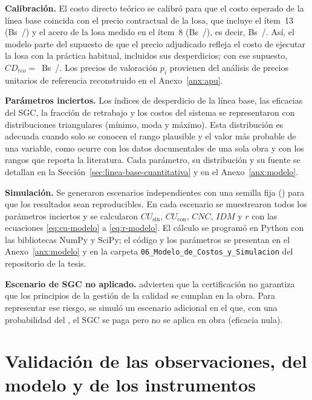 \textbf{Calibración.} El costo directo teórico se calibró para que el costo esperado de la línea base coincida con el precio contractual de la losa, que incluye el ítem~13 (Bs~\PUitemTrece/\mdos{}) y el acero de la losa medido en el ítem~8 (Bs~\PUaceroLosa/\mdos{}), es decir, Bs~\PUlosa/\mdos{}. Así, el modelo parte del supuesto de que el precio adjudicado refleja el costo de ejecutar la losa con la práctica habitual, incluidos sus desperdicios; con ese supuesto, $CD_{teo} = $~Bs~\CDteo/\mdos{}. Los precios de valoración $p_i$ provienen del análisis de precios unitarios de referencia reconstruido en el Anexo~\ref{anx:apu}.

\textbf{Parámetros inciertos.} Los índices de desperdicio de la línea base, las eficacias del SGC, la fracción de retrabajo y los costos del sistema se representaron con distribuciones triangulares (mínimo, moda y máximo). Esta distribución es adecuada cuando solo se conocen el rango plausible y el valor más probable de una variable, como ocurre con los datos documentales de una sola obra y con los rangos que reporta la literatura. Cada parámetro, su distribución y su fuente se detallan en la Sección~\ref{sec:linea-base-cuantitativa} y en el Anexo~\ref{anx:modelo}.

\textbf{Simulación.} Se generaron \MCiter{} escenarios independientes con una semilla fija (\MCsemilla) para que los resultados sean reproducibles. En cada escenario se muestrearon todos los parámetros inciertos y se calcularon $CU_{\text{sin}}$, $CU_{\text{con}}$, $CNC$, $IDM$ y $r$ con las ecuaciones \eqref{eq:cu-modelo} a \eqref{eq:r-modelo}. El cálculo se programó en Python con las bibliotecas NumPy y SciPy; el código y los parámetros se presentan en el Anexo~\ref{anx:modelo} y en la carpeta \texttt{06\_Modelo\_de\_Costos\_y\_Simulacion} del repositorio de la tesis.

\textbf{Escenario de SGC no aplicado.} \textcite{romero2007} advierten que la certificación no garantiza que los principios de la gestión de la calidad se cumplan en la obra. Para representar ese riesgo, se simuló un escenario adicional en el que, con una probabilidad del \PiFalla{}, el SGC se paga pero no se aplica en obra (eficacia nula).

\section{Validación de las observaciones, del modelo y de los instrumentos}
\label{sec:validacion}

